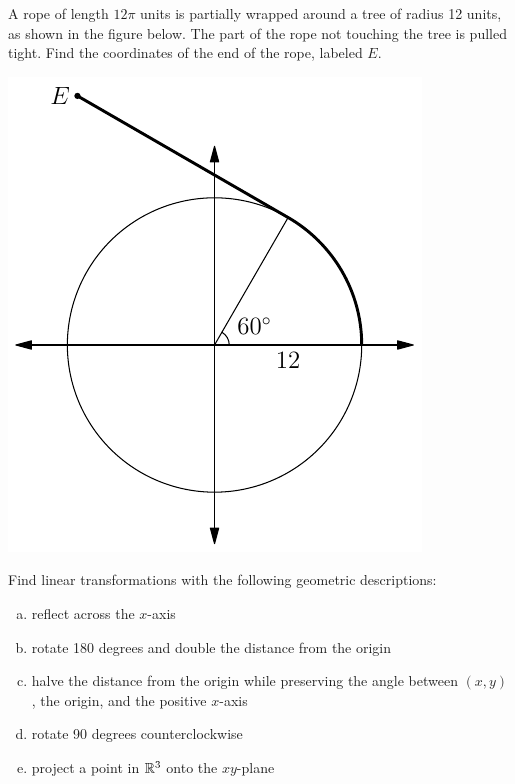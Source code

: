 \documentclass{watsonbook}
\begin{document}
\begin{aexercise}
  A rope of length $12\pi$ units is partially wrapped around a tree of
  radius 12 units, as shown in the figure below. The part of the rope
  not touching the tree is pulled tight. Find the coordinates of the
  end of the rope, labeled $E$.
  \begin{center}
    \includegraphics{exercisefigures/ropetree}
  \end{center}
\end{aexercise}

\newpage 


\begin{aexercise}
  Find linear transformations with the following geometric
  descriptions: 
  \begin{enumerate}[(a)]
  \item reflect across the $x$-axis
  \item rotate 180 degrees and double the distance from the origin
  \item halve the distance from the origin while preserving the angle
    between $(x,y)$, the origin, and the positive $x$-axis
  \item  rotate 90 degrees counterclockwise
  \item project a point in $\mathbb{R}^3$ onto the $xy$-plane
  \end{enumerate}
\end{aexercise}
\end{document}
